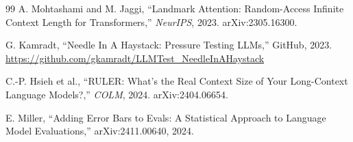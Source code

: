 \documentclass[11pt]{article}
\begin{document}
\begin{thebibliography}{99}
A. Mohtashami and M. Jaggi, ``Landmark Attention: Random-Access Infinite Context Length for Transformers,'' \textit{NeurIPS}, 2023. arXiv:2305.16300.

G. Kamradt, ``Needle In A Haystack: Pressure Testing LLMs,'' GitHub, 2023. \url{https://github.com/gkamradt/LLMTest_NeedleInAHaystack}

C.-P. Hsieh et al., ``RULER: What's the Real Context Size of Your Long-Context Language Models?,'' \textit{COLM}, 2024. arXiv:2404.06654.

E. Miller, ``Adding Error Bars to Evals: A Statistical Approach to Language Model Evaluations,'' arXiv:2411.00640, 2024.

\end{thebibliography}
\end{document}
